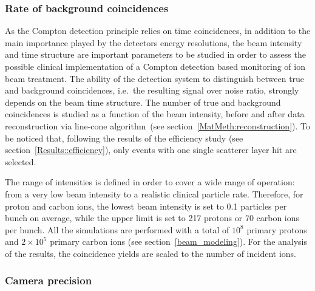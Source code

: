\subsubsection{Rate of background coincidences}

As the Compton detection principle relies on time coincidences, in addition to the main importance played by the detectors energy resolutions, the beam intensity and time structure are important parameters to be studied in order to assess the possible clinical implementation of a Compton detection based monitoring of ion beam treatment. The ability of the detection system to distinguish between true and background coincidences, i.e.~the resulting signal over noise ratio, strongly depends on the beam time structure. The number of true and background coincidences is studied as a function of the beam intensity, before and after data reconstruction via line-cone algorithm~(see section~\ref{MatMeth:reconstruction}). To be noticed that, following the results of the efficiency study (see section~\ref{Results::efficiency}), only events with one single scatterer layer hit are selected. 

The range of intensities is defined in order to cover a wide range of operation: from a very low beam intensity to a realistic clinical particle rate. Therefore, for proton and carbon ions, the lowest beam intensity is set to 0.1 particles per bunch on average, while the upper limit is set to 217 protons or 70 carbon ions per bunch. All the simulations are performed with a total of $10^{8}$ primary protons and  $2\times10^{5}$ primary carbon ions (see section~\ref{beam_modeling}). For the analysis of the results, the coincidence yields are scaled to the number of incident ions.

\subsubsection{Camera precision}
\label{MatMeth:precision}


